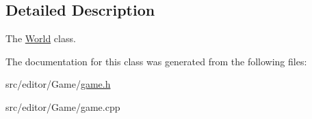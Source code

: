 \subsection{\-Detailed \-Description}
\-The \hyperlink{class_world}{\-World} class. 

\-The documentation for this class was generated from the following files\-:\begin{DoxyCompactItemize}
\item 
src/editor/\-Game/\hyperlink{game_8h}{game.\-h}\item 
src/editor/\-Game/game.\-cpp\end{DoxyCompactItemize}

